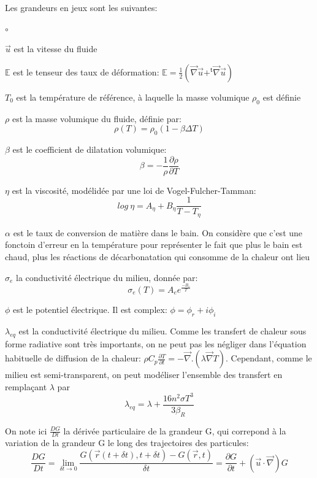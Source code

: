 \documentclass[12pt, a4paper, french, BCOR = 0pt, DIV = 10]{scrartcl}
\begin{document}
    Les grandeurs en jeux sont les suivantes:
    \begin{list}{$\circ$}{}
        \item $\vec{u}$ est la vitesse du fluide
        \item $\mathbb{E}$ est le tenseur des taux de déformation: $\mathbb{E} = \frac{1}{2} (\vec{\nabla} \vec{u} + ^{\mathsf{t}}\vec{\nabla} \vec{u})$
        \item $T_{0}$ est la température de référence, à laquelle la masse volumique $\rho_{0}$ est définie
        \item $\rho$ est la masse volumique du fluide, définie par:$$\rho(T) = \rho_{0} (1 - \beta \Delta T)$$
        \item $\beta$ est le coefficient de dilatation volumique: $$\beta = -\frac{1}{\rho} \frac{\partial\rho}{\partial T}$$
        \item $\eta$ est la viscosité, modélidée par une loi de Vogel-Fulcher-Tamman: $$log~\eta = A_{\eta} + B_{\eta}\frac{1}{T - T_{\eta}}$$
        \item $\alpha$ est le taux de conversion de matière dans le bain. On considère que c'est une fonctoin d'erreur en la température pour représenter le fait que plus le bain est chaud, plus les réactions de décarbonatation qui consomme de la chaleur ont lieu
        \item $\sigma_{e}$ la conductivité électrique du milieu, donnée par: $$\sigma_{e} (T) =  A_{e} e^{\frac{-B_{e}}{T}}$$
        \item $\phi$ est le potentiel électrique. Il est complex: $\phi = \phi_{r} + i\phi_{i} $
        \item $\lambda_{eq}$ est la conductivité électrique du milieu. Comme les transfert de chaleur sous forme radiative sont très importants, on ne peut pas les négliger dans l'équation habituelle de diffusion de la chaleur: $ \rho C_{p} \frac{\partial T}{\partial t} = - \vec{\nabla} . (\lambda\vec{\nabla}T) $. Cependant, comme le milieu est semi-transparent, on peut modéliser l'ensemble des transfert en remplaçant $\lambda$ par $$\lambda_{eq} = \lambda + \frac{16n^{2} \sigma T^{3}}{3\beta_{R}} $$
    \end{list}

    On note ici $\frac{DG}{Dt}$ la dérivée particulaire de la grandeur G, qui correpond à la variation de la grandeur G le long des trajectoires des particules: $$\frac{DG}{Dt} = \lim_{\delta t \to 0} \frac{G(\vec{r}(t + \delta t), t + \delta t) - G(\vec{r}, t)}{\delta t} = \frac{\partial G}{\partial t} + \left(\vec {u} \cdot \vec {\nabla } \right) G$$
\end{document}
